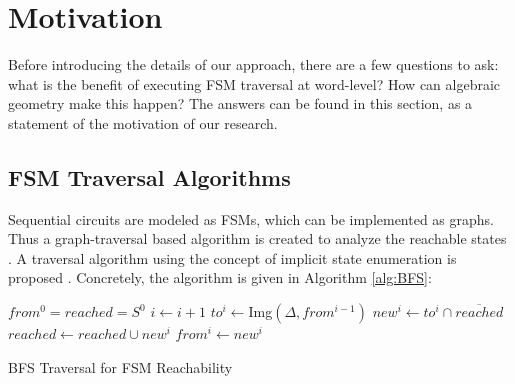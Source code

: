 \section{Motivation}
Before introducing the details of our approach, there are a few questions to ask: what is 
the benefit of executing FSM traversal at word-level? How can algebraic geometry make this happen?
The answers can be found in this section, as a statement of the motivation of our research.

\subsection{FSM Traversal Algorithms}
Sequential circuits are modeled as FSMs, which can be implemented as graphs. Thus a 
graph-traversal based algorithm is created to analyze the reachable states \cite{coudert2003unified}.
A traversal algorithm using the concept of implicit state enumeration is proposed \cite{cho1993redundancy}.
Concretely, the algorithm is given in Algorithm \ref{alg:BFS}:

% 

\IncMargin{1em}
\begin{algorithm}[hbt]
\SetAlgoNoLine
\LinesNumbered
\Indm
\Indp

  $from^0 = reached = S^0$\;
  {
  	$i \gets i + 1$\;
	$to^i \gets$Img$(\Delta, from^{i-1})$\;
	$new^i \gets to^i \cap \overline{reached}$\;
  	$reached \gets reached \cup new^i$\;
	$from^i \gets new^i$\;
  }
\caption {BFS Traversal for FSM Reachability}\label{alg:BFS}
\end{algorithm}
\DecMargin{1em}

